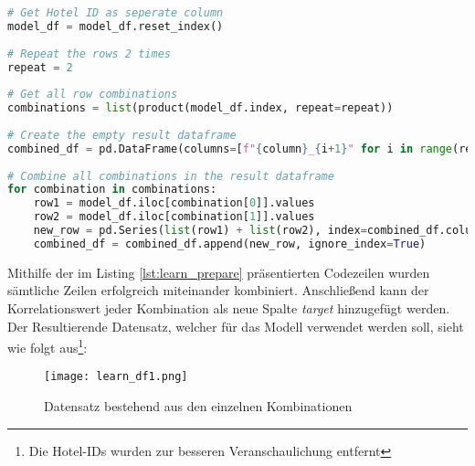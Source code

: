 \begin{lstlisting}[language=Python, label=lst:learn_prepare, caption=Erstellen des kombinierten Datensatzes]
# Get Hotel ID as seperate column
model_df = model_df.reset_index()
    
# Repeat the rows 2 times
repeat = 2
    
# Get all row combinations 
combinations = list(product(model_df.index, repeat=repeat))
    
# Create the empty result dataframe
combined_df = pd.DataFrame(columns=[f"{column}_{i+1}" for i in range(repeat) for column in model_df.columns])
    
# Combine all combinations in the result dataframe
for combination in combinations:
    row1 = model_df.iloc[combination[0]].values
    row2 = model_df.iloc[combination[1]].values
    new_row = pd.Series(list(row1) + list(row2), index=combined_df.columns)
    combined_df = combined_df.append(new_row, ignore_index=True)
\end{lstlisting}

Mithilfe der im Listing \ref{lst:learn_prepare} präsentierten Codezeilen wurden sämtliche Zeilen erfolgreich miteinander kombiniert. Anschließend kann der Korrelationswert jeder Kombination als neue Spalte \emph{target} hinzugefügt werden.
\newline
\newline
Der Resultierende Datensatz, welcher für das Modell verwendet werden soll, sieht wie folgt aus\footnote{Die Hotel-IDs wurden zur besseren Veranschaulichung entfernt}:

\begin{figure}[h]
    \centering
    \texttt{[image: learn\_df1.png]}
    \caption[Datensatz bestehend aus den einzelnen Kombinationen]{Datensatz bestehend aus den einzelnen Kombinationen}
    \label{img:learn_df1}
\end{figure}

